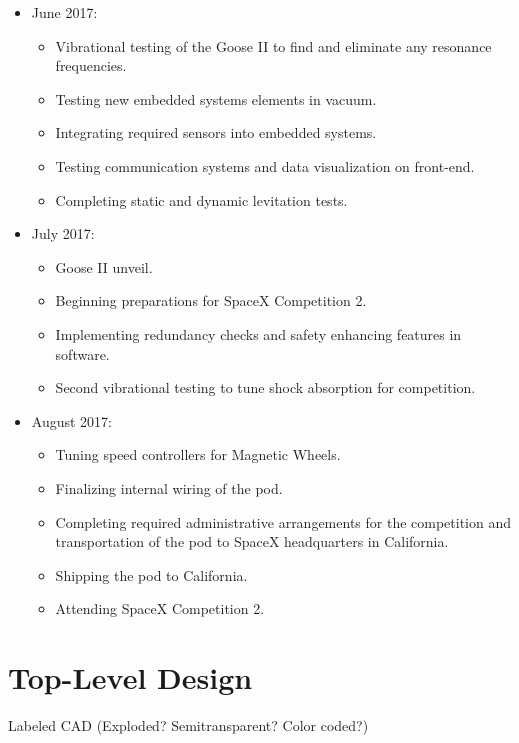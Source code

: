 \documentclass[main.tex]{subfiles}
\begin{document}
\begin{itemize}
\item June 2017:
\begin{itemize}
    \item Vibrational testing of the Goose II to find and eliminate any resonance frequencies.
    \item Testing new embedded systems elements in vacuum.
    \item Integrating required sensors into embedded systems.
    \item Testing communication systems and data visualization on front-end.
    \item Completing static and dynamic levitation tests.
\end{itemize}

\item July 2017:
\begin{itemize}
    \item Goose II unveil.
    \item Beginning preparations for SpaceX Competition 2.
    \item Implementing redundancy checks and safety enhancing features in software.
    \item Second vibrational testing to tune shock absorption for competition.
\end{itemize}

\item August 2017:
\begin{itemize}
    \item Tuning speed controllers for Magnetic Wheels.
    \item Finalizing internal wiring of the pod.
    \item Completing required administrative arrangements for the competition and transportation of the pod to SpaceX headquarters in California.
    \item Shipping the pod to California.
    \item Attending SpaceX Competition 2.
\end{itemize}

\end{itemize}

\chapter{Top-Level Design}
Labeled CAD (Exploded? Semitransparent? Color coded?)\\
\end{document}
